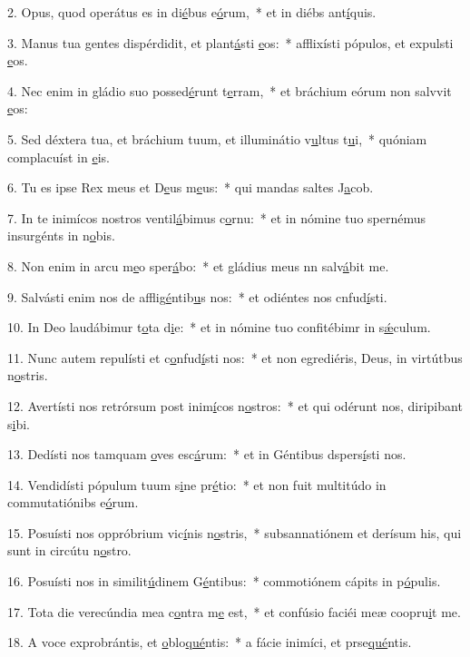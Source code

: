 2. Opus, quod operátus es in di\uline{é}bus e\uline{ó}rum,~* et in diébs ant\uline{í}quis.\par 
3. Manus tua gentes dispérdidit, et plant\uline{á}sti \uline{e}os:~* afflixísti pópulos, et expulsti \uline{e}os.\par 
4. Nec enim in gládio suo possed\uline{é}runt t\uline{e}rram,~* et bráchium eórum non salvvit \uline{e}os:\par 
5. Sed déxtera tua, et bráchium tuum, et illuminátio v\uline{u}ltus t\uline{u}i,~* quóniam complacuíst in \uline{e}is.\par 
6. Tu es ipse Rex meus et D\uline{e}us m\uline{e}us:~* qui mandas saltes J\uline{a}cob.\par 
7. In te inimícos nostros ventil\uline{á}bimus c\uline{o}rnu:~* et in nómine tuo spernémus insurgénts in n\uline{o}bis.\par 
8. Non enim in arcu m\uline{e}o sper\uline{á}bo:~* et gládius meus nn salv\uline{á}bit me.\par 
9. Salvásti enim nos de afflig\uline{é}ntib\uline{u}s nos:~* et odiéntes nos cnfud\uline{í}sti.\par 
10. In Deo laudábimur t\uline{o}ta d\uline{i}e:~* et in nómine tuo confitébimr in s\uline{ǽ}culum.\par 
11. Nunc autem repulísti et c\uline{o}nfud\uline{í}sti nos:~* et non egrediéris, Deus, in virtútbus n\uline{o}stris.\par 
12. Avertísti nos retrórsum post inim\uline{í}cos n\uline{o}stros:~* et qui odérunt nos, diripibant s\uline{i}bi.\par 
13. Dedísti nos tamquam \uline{o}ves esc\uline{á}rum:~* et in Géntibus dspers\uline{í}sti nos.\par 
14. Vendidísti pópulum tuum s\uline{i}ne pr\uline{é}tio:~* et non fuit multitúdo in commutatiónibs e\uline{ó}rum.\par 
15. Posuísti nos oppróbrium vic\uline{í}nis n\uline{o}stris,~* subsannatiónem et derísum his, qui sunt in circútu n\uline{o}stro.\par 
16. Posuísti nos in similit\uline{ú}dinem G\uline{é}ntibus:~* commotiónem cápits in p\uline{ó}pulis.\par 
17. Tota die verecúndia mea c\uline{o}ntra m\uline{e} est,~* et confúsio faciéi meæ coopru\uline{i}t me.\par 
18. A voce exprobrántis, et \uline{o}blo\uline{qué}ntis:~* a fácie inimíci, et prse\uline{qué}ntis.\par 
